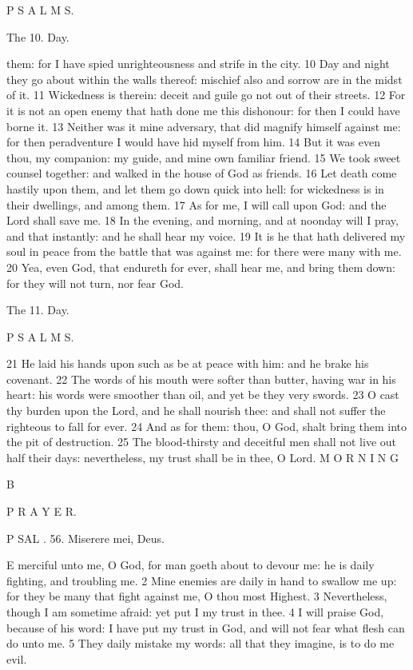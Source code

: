 P S A L M S.

The 10. Day.

them: for I have spied unrighteousness and strife in the city. 10 Day and night they go about within the walls thereof: mischief also and sorrow are in the midst of it. 11 Wickedness is therein: deceit and guile go not out of their streets. 12 For it is not an open enemy that hath done me this dishonour: for then I could have borne it. 13 Neither was it mine adversary, that did magnify himself against me: for then peradventure I would have hid myself from him. 14 But it was even thou, my companion: my guide, and mine own familiar friend. 15 We took sweet counsel together: and walked in the house of God as friends. 16 Let death come hastily upon them, and let them go down quick into hell: for wickedness is in their dwellings, and among them. 17 As for me, I will call upon God: and the Lord shall save me. 18 In the evening, and morning, and at noonday will I pray, and that instantly: and he shall hear my voice. 19 It is he that hath delivered my soul in peace from the battle that was against me: for there were many with me. 20 Yea, even God, that endureth for ever, shall hear me, and bring them down: for they will not turn, nor fear God.

The 11. Day.

P S A L M S.

21 He laid his hands upon such as be at peace with him: and he brake his covenant. 22 The words of his mouth were softer than butter, having war in his heart: his words were smoother than oil, and yet be they very swords. 23 O cast thy burden upon the Lord, and he shall nourish thee: and shall not suffer the righteous to fall for ever. 24 And as for them: thou, O God, shalt bring them into the pit of destruction. 25 The blood-thirsty and deceitful men shall not live out half their days: nevertheless, my trust shall be in thee, O Lord. M O R N I N G

B

P R A Y E R.

P SAL . 56. Miserere mei, Deus.

E merciful unto me, O God, for man goeth about to devour me: he is daily fighting, and troubling me. 2 Mine enemies are daily in hand to swallow me up: for they be many that fight against me, O thou most Highest. 3 Nevertheless, though I am sometime afraid: yet put I my trust in thee. 4 I will praise God, because of his word: I have put my trust in God, and will not fear what flesh can do unto me. 5 They daily mistake my words: all that they imagine, is to do me evil.

